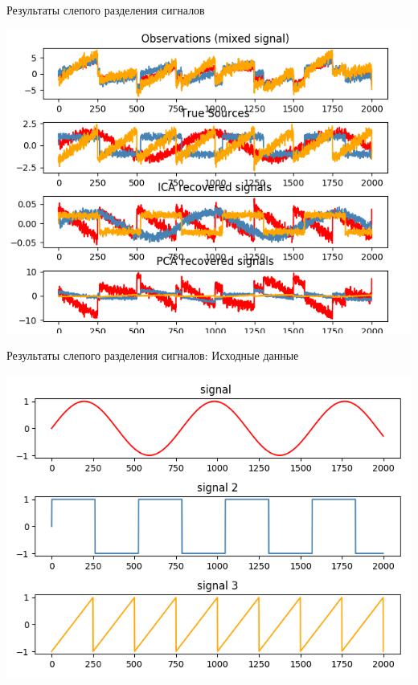 \documentclass[pdf, intlimits, 9pt, unicode]{beamer}
\begin{document}
\begin{frame}{Результаты слепого разделения сигналов}\begin{center}\includegraphics[height=\textheight]{src/1.png}\end{center}\end{frame}
\begin{frame}{Результаты слепого разделения сигналов: Исходные данные}\begin{center}\includegraphics[height=\textheight]{src/2.png}\end{center}\end{frame}
\end{document}
